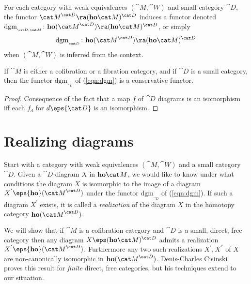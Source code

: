 For each category with weak equivalences $({\cat M}, {\cat W})$ and small category ${\cat D}$, the functor ${\cat M}^{\cat D} \ra ({\bf ho}{\cat M})^{\cat D}$ induces a functor denoted $\mathrm{dgm}_{_{{\cat D}, {\cat M}}} \colon {\bf ho}({\cat M}^{\cat D}) \ra ({\bf ho}{\cat M})^{\cat D}$, or simply
\begin{equation}
\label{eqn:dgm}
\mathrm{dgm}_{_{{\cat D}}} \colon {\bf ho}({\cat M}^{\cat D}) \ra ({\bf ho}{\cat M})^{\cat D}
\end{equation}
when $({\cat M}, {\cat W})$ is inferred from the context.

\begin{cor}
\label{cor:homotcatconservative}
If ${\cat M}$ is either a cofibration or a fibration category, and if ${\cat D}$ is a small category, then the functor $\mathrm{dgm}_{_{\cat D}}$ of (\ref{eqn:dgm}) is a conservative functor.
\end{cor}

\begin{proof}
Consequence of the fact that a map $f$ of ${\cat D}$ diagrams is an isomorphism iff each $f_d$ for $d \eps {\cat D}$ is an isomorphism.
\end{proof}

\section{Realizing diagrams}
\label{sec:realizingdiagrams}

Start with a category with weak equivalences $({\cat M}, {\cat W})$ and a small category ${\cat D}$. Given a ${\cat D}$-diagram $X$ in ${\bf ho}{\cat M}$, we would like to know under what conditions the diagram $X$ is isomorphic to the image of a diagram $X^{'} \eps {\bf ho}({\cat M}^{\cat D})$ under the functor $\mathrm{dgm}_{_{\cat D}}$ of (\ref{eqn:dgm}). If such a diagram $X^{'}$ exists, it is called a {\it realization} of the diagram $X$ in the homotopy category ${\bf ho}({\cat M}^{\cat D})$.

We will show that if ${\cat M}$ is a cofibration category and ${\cat D}$ is a small, direct, free category then any diagram $X \eps ({\bf ho}{\cat M})^{\cat D}$ admits a realization $X^{'} \eps {\bf ho}({\cat M}^{\cat D})$. Furthermore any two such realizations $X^{'}, X^{''}$ of $X$ are non-canonically isomorphic in ${\bf ho}({\cat M}^{\cat D})$. Denis-Charles Cisinski \cite{Cisinski2} proves this result for {\it finite} direct, free categories, but his techniques extend to our situation.

